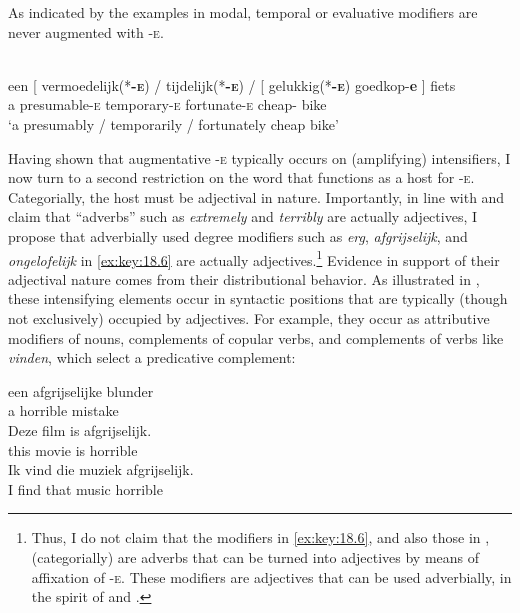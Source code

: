 \documentclass[output=paper]{langsci/langscibook}
\begin{document}
As indicated by the examples in  modal, temporal or evaluative
modifiers are never augmented with \textsc{-e}.

\ea%
    \label{ex:key:18.13}\\
    \gll een [ vermoedelijk(*\textbf{\textsc{-e}})  /  tijdelijk(*\textbf{\textsc{-e}})    /  [ gelukkig(*\textbf{\textsc{-e}})    goedkop-\textbf{e} ] fiets\\
    a  {}    presumable-\textsc{e}  {}  temporary-\textsc{e} {} {} fortunate-\textsc{e}  cheap-\Agr{} {} bike\\
    \glt \enquote*{a presumably / temporarily / fortunately cheap bike}
\z

Having shown that augmentative -\textsc{e} typically occurs on (amplifying)
intensifiers, I now turn to a second restriction on the word that functions as
a host for \textsc{-e}. Categorially, the host must be adjectival in nature.
Importantly, in line with  and  claim
that  \enquote{adverbs} such as \emph{extremely} and \emph{terribly} are
actually adjectives, I propose that adverbially used degree modifiers such as
\emph{erg}, \emph{afgrijselijk}, and \emph{ongelofelijk} in \eqref{ex:key:18.6} are
actually adjectives.\footnote{Thus, I do not claim that the modifiers in
\eqref{ex:key:18.6}, and also those in , (categorially) are adverbs
that can be turned into adjectives by means of affixation of \textsc{-e}. These
modifiers are adjectives that can be used adverbially, in the spirit of
\citet{Bowers1975} and \citet{Emonds1976}.} Evidence in support of their
adjectival nature comes from their distributional behavior. As illustrated in
, these intensifying elements occur in syntactic positions that
are typically (though not exclusively) occupied by adjectives. For example,
they occur as attributive modifiers of nouns, complements of copular
verbs, and
complements of verbs like \emph{vinden}, which  select a predicative
complement:

\ea%
    \label{ex:key:18.14}
	\ea
	\gll  een    afgrijselijke  blunder\\
		 a        horrible          mistake\\
	\ex
	\gll  Deze    film      is    afgrijselijk.\\
		this      movie  is    horrible\\
	\ex
	\gll Ik    vind    die    muziek    afgrijselijk.\\
		  I      find    that  music    horrible\\
	\z
\z
\end{document}
